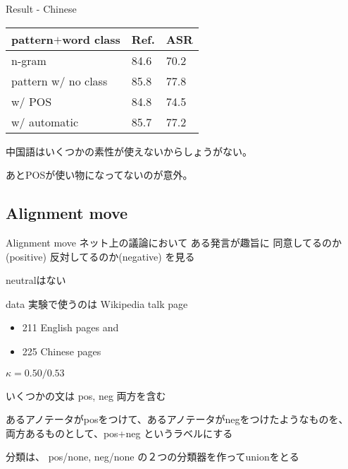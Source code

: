 \documentclass[12pt, dvipdfmx, default, cjk]{beamer}
\begin{document}
\begin{frame}{Result - Chinese}
  \begin{table}[h]
    \begin{tabular}{l|l|l} \hline
      pattern$+$word class & Ref. & ASR \\ \hline
      n-gram               & 84.6 & 70.2 \\
      pattern w/ no class  & \alert{85.8} & \alert{77.8} \\
      w/ POS                  & 84.8 & 74.5 \\
      w/ automatic            & 85.7 & 77.2 \\ \hline
    \end{tabular}
  \end{table}
  中国語はいくつかの素性が使えないからしょうがない。

  あとPOSが使い物になってないのが意外。
\end{frame}

\subsection{Alignment move}
\begin{frame}{Alignment move}
  ネット上の議論において
  ある発言が趣旨に
  同意してるのか(positive)
  反対してるのか(negative)
  を見る

  neutralはない
\end{frame}

\begin{frame}{data}
実験で使うのは
Wikipedia talk page

\begin{itemize}
  \item 211 English pages and 
  \item 225 Chinese pages
\end{itemize}

$\kappa = 0.50 / 0.53$

いくつかの文は pos, neg 両方を含む

あるアノテータがposをつけて、あるアノテータがnegをつけたようなものを、
両方あるものとして、pos+neg というラベルにする

分類は、
\alert{pos/none},
\alert{neg/none}
の２つの分類器を作ってunionをとる
\end{frame}
\end{document}
